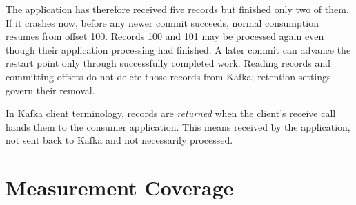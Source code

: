 \documentclass[10pt]{article}
\begin{document}
The application has therefore received five records but finished only two of them. If it crashes now, before any newer commit succeeds, normal consumption resumes from offset 100. Records 100 and 101 may be processed again even though their application processing had finished. A later commit can advance the restart point only through successfully completed work. Reading records and committing offsets do not delete those records from Kafka; retention settings govern their removal.

In Kafka client terminology, records are \emph{returned} when the client's receive call hands them to the consumer application. This means received by the application, not sent back to Kafka and not necessarily processed.

\clearpage
\section{Measurement Coverage}
\label{app:measurement-coverage}
\begingroup
\centering\footnotesize
\setlength{\tabcolsep}{3pt}
\renewcommand{\arraystretch}{1.06}
\end{document}
